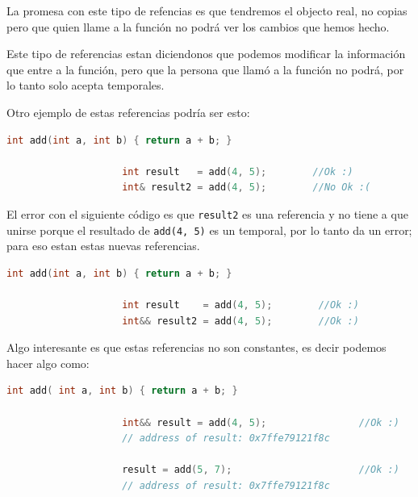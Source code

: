 \documentclass[12pt, fleqn]{report}                             %
\theoremstyle{break}                                            %
\newcommand{\textCode}[1]  { \texttt{#1} }                      %
\begin{document}
                La promesa con este tipo de refencias es que tendremos el objecto real, no copias
                pero que quien llame a la función no podrá ver los cambios que hemos hecho.

                Este tipo de referencias estan diciendonos que podemos modificar la información
                que entre a la función, pero que la persona que llamó a la función no podrá, por lo tanto
                solo acepta temporales.

                \cite{CppFromBeginningToIntermidiate}

                Otro ejemplo de estas referencias podría ser esto:
                \begin{lstlisting}[language=C++, gobble=20]
                    int add(int a, int b) { return a + b; }
 
                    int result   = add(4, 5);        //Ok :)
                    int& result2 = add(4, 5);        //No Ok :(
                \end{lstlisting}
                
                El error con el siguiente código es que \textCode{result2} es una
                referencia y no tiene a que unirse porque el resultado de \textCode{add(4, 5)}
                es un temporal, por lo tanto da un error; para eso estan estas nuevas referencias.

                \begin{lstlisting}[language=C++, gobble=20]
                    int add(int a, int b) { return a + b; }
 
                    int result    = add(4, 5);        //Ok :)
                    int&& result2 = add(4, 5);        //Ok :)
                \end{lstlisting}
                
                Algo interesante es que estas referencias no son constantes, 
                es decir podemos hacer algo como:
                \begin{lstlisting}[language=C++, gobble=20]
                    int add( int a, int b) { return a + b; }
 
                    int&& result = add(4, 5);                //Ok :)
                    // address of result: 0x7ffe79121f8c
                    
                    result = add(5, 7);                      //Ok :)
                    // address of result: 0x7ffe79121f8c
                \end{lstlisting}
\end{document}

